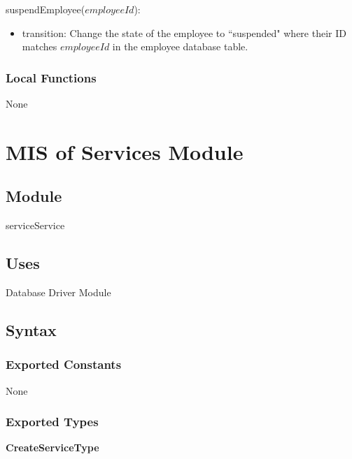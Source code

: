 \documentclass[12pt, titlepage]{article}
\begin{document}
\noindent suspendEmployee($employeeId$):
\begin{itemize}
	\item transition: Change the state of the employee to ``suspended" where their ID matches $employeeId$ in
	      the employee database table.
\end{itemize}

\subsubsection{Local Functions}

None

\newpage

\section{MIS of Services Module} \label{mServices}
\subsection{Module}

serviceService

\subsection{Uses}

Database Driver Module

\subsection{Syntax}

\subsubsection{Exported Constants}

None

\subsubsection{Exported Types}

\textbf{CreateServiceType}
\end{document}

